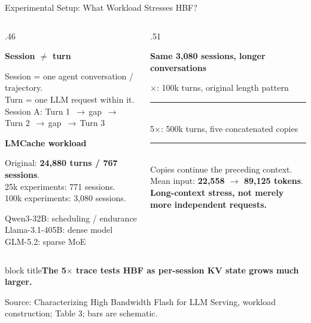 \documentclass[aspectratio=169,10pt]{beamer}
\newcommand{\takeaway}[1]{\par\vspace{.12cm}\begin{beamercolorbox}[rounded=true,sep=.12cm,wd=\linewidth]{block title}\small\bfseries #1\end{beamercolorbox}}
\newcommand{\src}[1]{\par\vfill{\fontsize{7}{8}\selectfont\color{Muted}Source: Characterizing High Bandwidth Flash for LLM Serving, #1.}\par}
\newcommand{\head}[1]{\par{\color{Accent}\bfseries #1}\par\smallskip}
\newcommand{\arr}{\,$\rightarrow$\,}
\begin{document}
\begin{frame}[t]{Experimental Setup: What Workload Stresses HBF?}

\begin{columns}[T,onlytextwidth]
\begin{column}{.46\textwidth}
\head{Session $\neq$ turn}
Session = one agent conversation / trajectory.\\
Turn = one LLM request within it.\\[.15cm]
Session A: Turn 1 \arr gap \arr Turn 2 \arr gap \arr Turn 3
\par\vspace{.12cm}
\head{LMCache workload}
Original: \textbf{24,880 turns / 767 sessions}.\\
25k experiments: 771 sessions.\\
100k experiments: 3,080 sessions.\par
\vspace{.2cm}
\small Qwen3-32B: scheduling / endurance\\
Llama-3.1-405B: dense model\\
GLM-5.2: sparse MoE
\end{column}
\begin{column}{.51\textwidth}
\head{Same 3,080 sessions, longer conversations}
1$\times$: 100k turns, original length pattern\\[.12cm]
{\color{Accent}\rule{1.7cm}{.18cm}}\\[.15cm]
5$\times$: 500k turns, five concatenated copies\\[.12cm]
{\color{Accent}\rule{6.5cm}{.18cm}}\\[.15cm]
Copies continue the preceding context.\\
Mean input: \textbf{22,558 $\rightarrow$ 89,125 tokens}.\\[.2cm]
\textbf{Long-context stress, not merely more independent requests.}
\end{column}
\end{columns}
\takeaway{The 5$\times$ trace tests HBF as per-session KV state grows much larger.}

\src{workload construction; Table 3; bars are schematic}
\end{frame}
\end{document}

